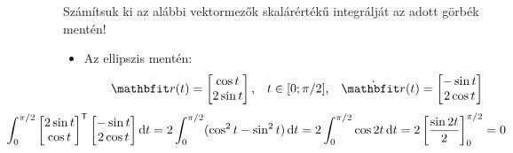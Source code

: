 \documentclass[exercise]{math-standalone}
\begin{document}
\begin{exercise}{Számítsuk ki az alábbi vektormezők skalárértékű integrálját az adott görbék mentén!}
{\begin{enumerate}[a)]
\begin{itemize}[i)]
              \item Az ellipszis mentén:
                    \[
                      \rvec r(t) = \begin{bmatrix}
                        \cos t \\ 2 \sin t
                      \end{bmatrix}
                      \text,\quad
                      t \in [0; \pi/2]
                      \text,\quad
                      \dot{\rvec r}(t) = \begin{bmatrix}
                        - \sin t \\ 2 \cos t
                      \end{bmatrix}
                    \]
                    \[
                      \hspace{-2.3cm}
                      \int_0^{\pi / 2} \begin{bmatrix}
                        2 \sin t \\ \cos t
                      \end{bmatrix}^\transpose
                      \begin{bmatrix}
                        - \sin t \\ 2 \cos t
                      \end{bmatrix}
                      \diff t
                      = 2 \int_0^{\pi / 2} (\cos^2 t - \sin^2 t) \, \diff t
                      = 2 \int_0^{\pi / 2} \cos 2t \, \diff t
                      = 2 \left[ \frac{\sin 2t}{2} \right]_0^{\pi / 2}
                      = 0
                    \]
            \end{itemize}
    \end{enumerate}
  }
\end{exercise}
\end{document}
